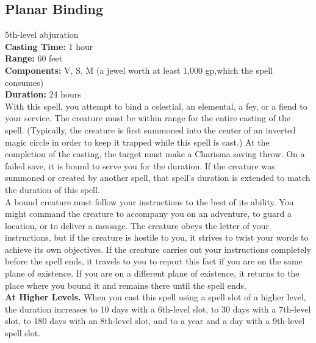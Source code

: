 \documentclass[11pt, A4paper, english]{article}
\begin{document}
		\subsection{Planar Binding}
5th-level abjuration \\
\textbf{Casting Time:} 1 hour \\
\textbf{Range:} 60 feet \\
\textbf{Components:} V, S, M (a jewel worth at least  1,000 gp,which the spell consumes) \\
\textbf{Duration:} 24 hours \\
With this spell, you attempt to bind a celestial, an elemental, a fey, or a fiend to your service. The creature must be within range for the entire casting of the spell. (Typically, the creature is first summoned into the center of an inverted magic circle in order to keep it trapped while this spell is cast.) At the completion of the casting, the target must make a Charisma saving throw. On a failed save, it is bound to serve you for the duration. If the creature was summoned or created by another spell, that spell’s duration is extended to match the duration of this spell. \\
A bound creature must follow your instructions to the best of its ability. You might command the creature to accompany you on an adventure, to guard a location, or to deliver a message. The creature obeys the letter of your instructions, but if the creature is hostile to you, it strives to twist your words to achieve its own objectives. If the creature carries out your instructions completely before the spell ends, it travels to you to report this fact if you are on the same plane of existence. If you are on a different plane of existence, it returns to the place where you bound it and remains there until the spell ends. \\
\textbf{At Higher Levels.} When you cast this spell using a spell slot of a higher level, the duration increases to 10 days with a 6th-level slot, to 30 days with a 7th-level slot, to 180 days with an 8th-level slot, and to a year and a day with a 9th-level spell slot.
\end{document}
